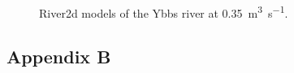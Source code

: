 \begin{figure}[h!]
\begin{tabular}{ l  c }
	\end{tabular}
	\label{fig:0035}
	
	\caption{River2d models of the Ybbs river at \SI[per-mode=symbol]{0.35}{\cubic\meter\per\second}.}   %
	
\end{figure}


\newpage                                                                %


\subsection*{Appendix B}\label{appendixB}                        %

\renewcommand\thefigure{A.\arabic{figure}}                          %
\setcounter{figure}{0}                                              %

